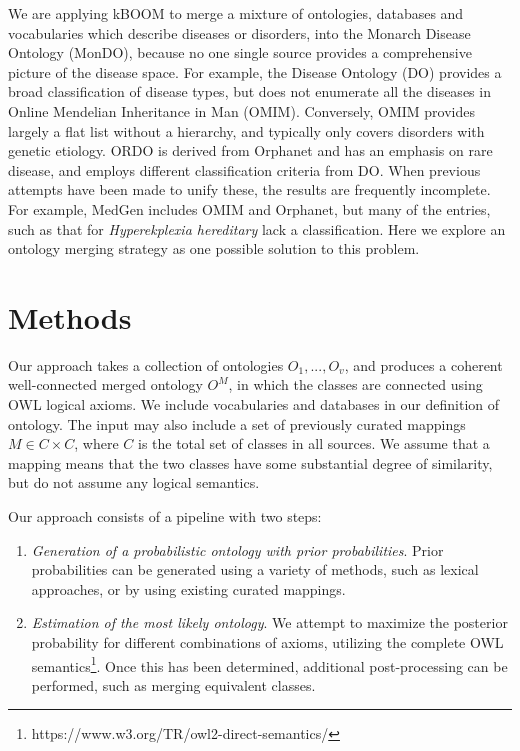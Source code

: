 \documentclass{my}
\begin{document}
We are applying kBOOM to merge a mixture of ontologies, databases and
vocabularies which describe diseases or disorders, into the Monarch
Disease Ontology (MonDO), because no one single
source provides a comprehensive picture of the disease space. For
example, the Disease Ontology (DO)\cite{Kibbe2014} provides a broad
classification of disease types, but does not enumerate all the
diseases in Online Mendelian Inheritance in Man
(OMIM)\cite{amberger2015}. Conversely, OMIM provides largely a flat
list without a hierarchy, and typically only covers disorders with genetic
etiology. ORDO\cite{vasant2014ordo} is derived from Orphanet and has an emphasis on rare disease, and
employs different classification criteria from DO. When previous
attempts have been made to unify these, the results are frequently
incomplete. For example, MedGen\cite{coordinators2015database} includes OMIM and Orphanet, but many
of the entries, such as that for \emph{Hyperekplexia hereditary} lack
a classification. Here we explore an ontology merging strategy as one possible solution to this problem.

\section{Methods}

Our approach takes a collection of ontologies $O_1,...,O_v$, and
produces a coherent well-connected merged ontology $O^M$, in which the
classes are connected using OWL logical axioms. We include
vocabularies and databases in our definition of ontology. The input
may also include a set of previously curated mappings $M \in C \times
C$, where $C$ is the total set of classes in all sources. We assume
that a mapping means that the two classes have some substantial degree
of similarity, but do not assume any logical semantics.

Our approach consists of a pipeline with two steps:

\begin{enumerate}
\item \emph{Generation of a probabilistic ontology with prior probabilities}. Prior probabilities can be generated using a variety of methods, such as lexical approaches, or by using existing curated mappings.
\item \emph{Estimation of the most likely ontology}. We attempt to maximize the posterior probability for different combinations of axioms, utilizing the complete OWL semantics\footnote{https://www.w3.org/TR/owl2-direct-semantics/}. Once this has been determined, additional post-processing can be performed, such as merging equivalent classes.
\end{enumerate}
\end{document}
